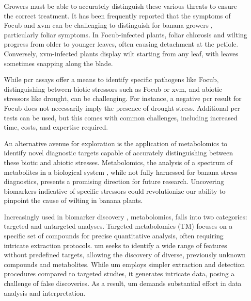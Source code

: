 Growers must be able to accurately distinguish these various threats to ensure the correct treatment. It has been frequently reported that the symptoms of \ac{Focub} and \ac{xvm} can be challenging to distinguish for banana growers \parencite{Stellenbosch24, PromusaSymps, Biruma2007}, particularly foliar symptoms. In \ac{Focub}-infected plants, foliar chlorosis and wilting progress from older to younger leaves, often causing detachment at the petiole. Conversely, \ac{xvm}-infected plants display wilt starting from any leaf, with leaves sometimes snapping along the blade. 

While \ac{pcr} assays offer a means to identify specific pathogens like \ac{Focub}, distinguishing between biotic stressors such as \ac{Focub} or \ac{xvm}, and abiotic stressors like drought, can be challenging. For instance, a negative \ac{pcr} result for \ac{Focub} does not necessarily imply the presence of drought stress. Additional \ac{pcr} tests can be used, but this comes with common challenges, including increased time, costs, and expertise required.

An alternative avenue for exploration is the application of metabolomics to identify novel diagnostic targets capable of accurately distinguishing between these biotic and abiotic stresses. Metabolomics, the analysis of a spectrum of metabolites in a biological system \parencite{Klassen2017}, while not fully harnessed for banana stress diagnostics, presents a promising direction for future research. Uncovering biomarkers indicative of specific stressors could revolutionize our ability to pinpoint the cause of wilting in banana plants.

Increasingly used in biomarker discovery \parencite{Li2016, Dang2018, Chen2023}, metabolomics, falls into two categories: targeted and untargeted analyses. Targeted metabolomics (TM) focuses on a specific set of compounds for precise quantitative analysis, often requiring intricate extraction protocols. \acf{um} seeks to identify a wide range of features without predefined targets, allowing the discovery of diverse, previously unknown compounds and metabolites. While \ac{um} employs simpler extraction and detection procedures compared to targeted studies, it generates intricate data, posing a challenge of false discoveries. As a result, \ac{um} demands substantial effort in data analysis and interpretation.

